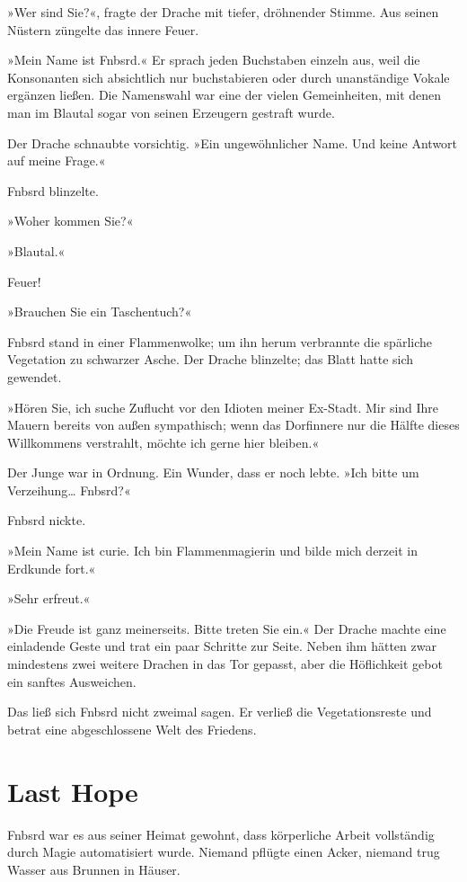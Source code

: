 »Wer sind Sie?«, fragte der Drache mit tiefer, dröhnender Stimme. Aus seinen Nüstern züngelte das innere Feuer.

»Mein Name ist Fnbsrd.« Er sprach jeden Buchstaben einzeln aus, weil die Konsonanten sich absichtlich nur buchstabieren oder durch unanständige Vokale ergänzen ließen. Die Namenswahl war eine der vielen Gemeinheiten, mit denen man im Blautal sogar von seinen Erzeugern gestraft wurde.

Der Drache schnaubte vorsichtig. »Ein ungewöhnlicher Name. Und keine Antwort auf meine Frage.«

Fnbsrd blinzelte.

»Woher kommen Sie?«

»Blautal.«

Feuer!

»Brauchen Sie ein Taschentuch?«

Fnbsrd stand in einer Flammenwolke; um ihn herum verbrannte die spärliche Vegetation zu schwarzer Asche. Der Drache blinzelte; das Blatt hatte sich gewendet.

»Hören Sie, ich suche Zuflucht vor den Idioten meiner Ex-Stadt. Mir sind Ihre Mauern bereits von außen sympathisch; wenn das Dorfinnere nur die Hälfte dieses Willkommens verstrahlt, möchte ich gerne hier bleiben.«

Der Junge war in Ordnung. Ein Wunder, dass er noch lebte. »Ich bitte um Verzeihung… Fnbsrd?«

Fnbsrd nickte.

»Mein Name ist curie. Ich bin Flammenmagierin und bilde mich derzeit in Erdkunde fort.«

 »Sehr erfreut.«

»Die Freude ist ganz meinerseits. Bitte treten Sie ein.« Der Drache machte eine einladende Geste und trat ein paar Schritte zur Seite. Neben ihm hätten zwar mindestens zwei weitere Drachen in das Tor gepasst, aber die Höflichkeit gebot ein sanftes Ausweichen.

Das ließ sich Fnbsrd nicht zweimal sagen. Er verließ die Vegetationsreste und betrat eine abgeschlossene Welt des Friedens.


\chapter{Last Hope}

Fnbsrd war es aus seiner Heimat gewohnt, dass körperliche Arbeit vollständig durch Magie automatisiert wurde. Niemand pflügte einen Acker, niemand trug Wasser aus Brunnen in Häuser.

